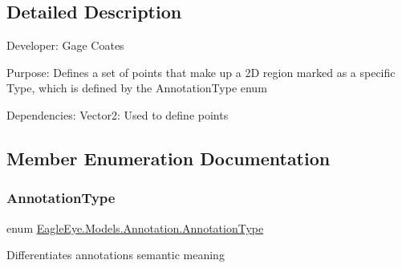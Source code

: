 \subsection{Detailed Description}
Developer\+: Gage Coates 

Purpose\+: Defines a set of points that make up a 2D region marked as a specific Type, which is defined by the Annotation\+Type enum

Dependencies\+: Vector2\+: Used to define points 

\subsection{Member Enumeration Documentation}
\mbox{\label{class_eagle_eye_1_1_models_1_1_annotation_a38b72003ea887909fe12d6382092f7d9}} 
\subsubsection{\texorpdfstring{AnnotationType}{AnnotationType}}
{\footnotesize\ttfamily enum \mbox{\hyperlink{class_eagle_eye_1_1_models_1_1_annotation_a38b72003ea887909fe12d6382092f7d9}{Eagle\+Eye.\+Models.\+Annotation.\+Annotation\+Type}}\hspace{0.3cm}{\ttfamily [strong]}}



Differentiates annotation\textquotesingle{}s semantic meaning 

